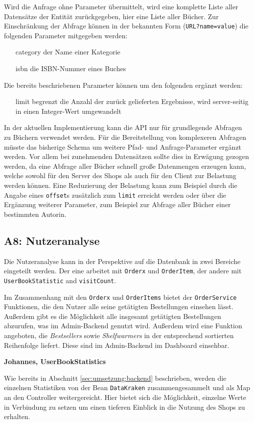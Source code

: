 	Wird die Anfrage ohne Parameter übermittelt, wird eine komplette Liste aller Datensätze der Entität zurückgegeben, hier eine Liste aller Bücher. Zur Einschränkung der Abfrage können in der bekannten Form (\lstinline|URL?name=value|) die folgenden Parameter mitgegeben werden:
	\begin{itemize}
		\item[category] der Name einer Kategorie
		\item[isbn] die ISBN-Nummer eines Buches
	\end{itemize}
	
	Die bereits beschriebenen Parameter können um den folgenden ergänzt werden:
	\begin{itemize}
		\item[limit] begrenzt die Anzahl der zurück gelieferten Ergebnisse, wird server-seitig in einen Integer-Wert umgewandelt
	\end{itemize}
	
	In der aktuellen Implementierung kann die API nur für grundlegende Abfragen zu Büchern verwendet werden. Für die Bereitstellung von komplexeren Abfragen müsste das bisherige Schema um weitere Pfad- und Anfrage-Parameter ergänzt werden. Vor allem bei zunehmenden Datensätzen sollte dies in Erwägung gezogen werden, da eine Abfrage aller Bücher schnell große Datenmengen erzeugen kann, welche sowohl für den Server des Shops als auch für den Client zur Belastung werden können. Eine Reduzierung der Belastung kann zum Beispiel durch die Angabe eines \lstinline|offset|s zusätzlich zum \lstinline|limit| erreicht werden oder über die Ergänzung weiterer Parameter, zum Beispiel zur Abfrage aller Bücher einer bestimmten Autorin.
	
	\subsection{A8: Nutzeranalyse}\label{sec:umsetzung:analyse}
	Die Nutzeranalyse kann in der Perspektive auf die Datenbank in zwei Bereiche eingeteilt werden. Der eine arbeitet mit \texttt{Orderx} und \texttt{OrderItem}, der andere mit \texttt{User\-Book\-Statistic} and \texttt{visitCount}.
	
	Im Zusammenhang mit den \texttt{Orderx} und \texttt{OrderItems} bietet der \texttt{OrderService} Funktionen, die den Nutzer alle seine getätigten Bestellungen einsehen lässt. Außerdem gibt es die Möglichkeit alle insgesamt getätigten Bestellungen abzurufen, was im Admin-Backend genutzt wird. Außerdem wird eine Funktion angeboten, die \textit{Bestsellers} sowie \textit{Shelfwarmers} in der entsprechend sortierten Reihenfolge liefert. Diese sind im Admin-Backend im Dashboard einsehbar.
	
	\textbf{Johannes, UserBookStatistics}
	
	Wie bereits in Abschnitt \ref{sec:umsetzung:backend} beschrieben, werden die einzelnen Statistiken von der Bean \lstinline|DataKraken| zusammengesammelt und als Map an den Controller weitergereicht. Hier bietet sich die Möglichkeit, einzelne Werte in Verbindung zu setzen um einen tieferen Einblick in die Nutzung des Shops zu erhalten.